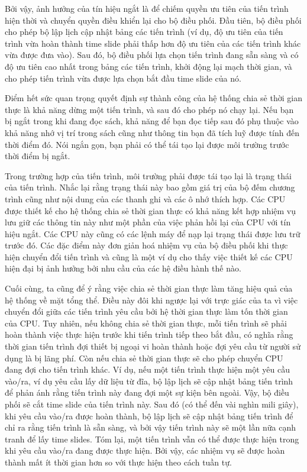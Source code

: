 Bởi vậy, ảnh hưởng của tín hiệu ngắt là để chiếm quyền ưu tiên của tiến trình hiện thời và
chuyển quyền điều khiển lại cho bộ điều phối. Đầu tiên, bộ điều phối cho phép bộ lập lịch
cập nhật bảng các tiến trình (ví dụ, độ ưu tiên của tiến trình vừa hoàn thành time slide
phải thấp hơn độ ưu tiên của các tiến trình khác vừa được đưa vào). Sau đó, bộ điều phối
lựa chọn tiến trình đang sẵn sàng và có độ ưu tiên cao nhất trong bảng các tiến trình,
khởi động lại mạch thời gian, và cho phép tiến trình vừa được lựa chọn bắt đầu time slide
của nó.

Điểm hết sức quan trọng quyết định sự thành công của hệ thống chia sẻ thời gian thực là
khả năng dừng một tiến trình, và sau đó cho phép nó chạy lại. Nếu bạn bị ngắt trong khi
đang đọc sách, khả năng để bạn đọc tiếp sau đó phụ thuộc vào khả năng nhớ vị trí trong
sách cũng như thông tin bạn đã tích luỹ được tính đến thời điểm đó. Nói ngắn gọn, bạn phải
có thể tái tạo lại được môi trường trước thời điểm bị ngắt.

Trong trường hợp của tiến trình, môi trường phải được tái tạo lại là trạng thái của tiến
trình. Nhắc lại rằng trạng thái này bao gồm giá trị của bộ đếm chương trình cũng như nội
dung của các thanh ghi và các ô nhớ thích hợp. Các CPU được thiết kế cho hệ thống chia sẻ
thời gian thực có khả năng kết hợp nhiệm vụ lưu giữ các thông tin này như một phần của
việc phản hồi lại của CPU với tín hiệu ngắt. Các CPU này cũng có các lệnh máy để nạp lại
trạng thái được lưu trữ trước đó. Các đặc điểm này đơn giản hoá nhiệm vụ của bộ điều phối
khi thực hiện chuyển đổi tiến trình và cũng là một ví dụ cho thấy việc thiết kế các CPU
hiện đại bị ảnh hưởng bởi nhu cầu của các hệ điều hành thế nào.

Cuối cùng, ta cũng để ý rằng việc chia sẻ thời gian thực làm tăng hiệu quả của hệ thống về
mặt tổng thể. Điều này đôi khi ngược lại với trực giác của ta vì việc chuyển đổi giữa các
tiến trình yêu cầu bởi hệ thời gian thực làm tốn thời gian của CPU. Tuy nhiên, nếu không
chia sẻ thời gian thực, mỗi tiến trình sẽ phải hoàn thành việc thực hiện trước khi tiến
trình tiếp theo bắt đầu, có nghĩa rằng thời gian tiến trình đợi thiết bị ngoại vi hoàn
thành hoặc đợi yêu cầu từ người sử dụng là bị lãng phí. Còn nếu chia sẻ thời gian thực sẽ
cho phép chuyển CPU đang đợi cho tiến trình khác. Ví dụ, nếu một tiến trình thực hiện một
yêu cầu vào/ra, ví dụ yêu cầu lấy dữ liệu từ đĩa, bộ lập lịch sẽ cập nhật bảng tiến trình
để phản ánh rằng tiến trình này đang đợi một sự kiện bên ngoài. Vậy, bộ điều phối sẽ cắt
time slide của tiến trình này. Sau đó (có thể đến vài nghìn mili giây), khi yêu cầu vào/ra
được hoàn thành, bộ lập lịch sẽ cập nhật bảng tiến trình để chỉ ra rằng tiến trình là sẵn
sàng, và bởi vậy tiến trình này sẽ một lần nữa cạnh tranh để lấy time slides. Tóm lại, một
tiến trình vẫn có thể được thực hiện trong khi yêu cầu vào/ra đang được thực hiện. Bởi
vậy, các nhiệm vụ sẽ được hoàn thành mất ít thời gian hơn so với thực hiện theo cách tuần
tự.

